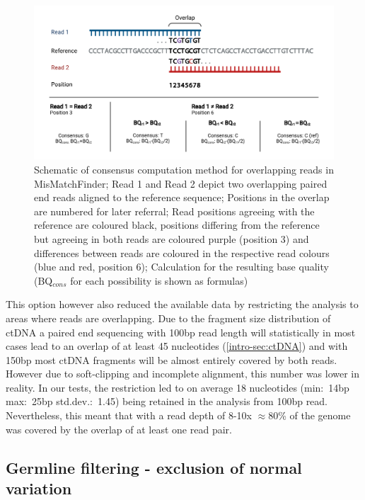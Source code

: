 \begin{figure}[!ht]
\centering
\includegraphics[width=.99\linewidth]{Figures/MisMatchFinder/ConsensusMethodMisMatchFinder.pdf}
\caption[Schematic of consensus computation method for overlapping reads]{Schematic of consensus computation method for overlapping reads in MisMatchFinder; Read 1 and Read 2 depict two overlapping paired end reads aligned to the reference sequence; Positions in the overlap are numbered for later referral; Read positions agreeing with the reference are coloured black, positions differing from the reference but agreeing in both reads are coloured purple (position 3) and differences between reads are coloured in the respective read colours (blue and red, position 6); Calculation for the resulting base quality (BQ$_{cons}$ for each possibility is shown as formulas)}\label{fig:mmf-consensus}
\end{figure}

This option however also reduced the available data by restricting the analysis to areas where reads are overlapping. Due to the fragment size distribution of ctDNA a paired end sequencing with 100bp read length will statistically in most cases lead to an overlap of at least 45 nucleotides (\autoref{intro-sec:ctDNA}) and with 150bp most ctDNA fragments will be almost entirely covered by both reads. However due to soft-clipping and incomplete alignment, this number was lower in reality.
In our tests, the restriction led to on average 18 nucleotides (min:~14bp max:~25bp std.dev.:~1.45) being retained in the analysis from 100bp read. Nevertheless, this meant that with a read depth of 8-10x $\approx$80\% of the genome was covered by the overlap of at least one read pair.



\subsection[Germline filtering]{Germline filtering - exclusion of normal variation}
\label{mmf-sec:germline}

